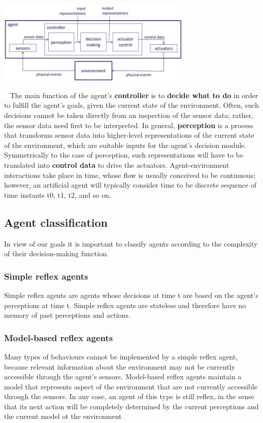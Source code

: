 \begin{center}
    \includegraphics[height=4cm]{../arguments/SensorsAndActuators.JPG}
\end{center}
\ \newline
The main function of the agent’s \textbf{controller} is to \textbf{decide what to do} in order to fulfill the
agent’s goals, given the current state of the environment. Often, such decisions cannot be taken directly from an inspection of the sensor data;
rather, the sensor data need first to be interpreted.\newline
In general, \textbf{perception} is a process that transforms sensor data into higher-level
representations of the current state of the environment, which are suitable inputs for the
agent’s decision module.\newline
Symmetrically to the case of perception, such representations will have to be translated
into \textbf{control data} to drive the actuators.
\newline
\newline
Agent-environment interactions take place in time, whose flow is usually conceived to be
continuous; however, an artificial agent will typically consider time to be discrete sequence
of time instants t0, t1, t2, and so on.
\subsection{Agent classification}
In view of our goals it is important to classify agents according to the complexity of their
decision-making function.
\subsubsection*{Simple reflex agents}
Simple reflex agents are agents whose decisions at time t are based on the agent’s
perceptions at time t.\newline
Simple reflex agents are stateless and therefore have no memory of past perceptions and
actions.
\subsubsection*{Model-based reflex agents}
Many types of behaviours cannot be implemented by a simple reflex agent, because
relevant information about the environment may not be currently accessible through the
agent’s sensors.\newline
Model-based reflex agents maintain a model that represents aspect of the environment
that are not currently accessible through the sensors.\newline
In any case, an agent of this type is still reflex, in the sense that its next action will be
completely determined by the current perceptions and the current model ot the
environment
